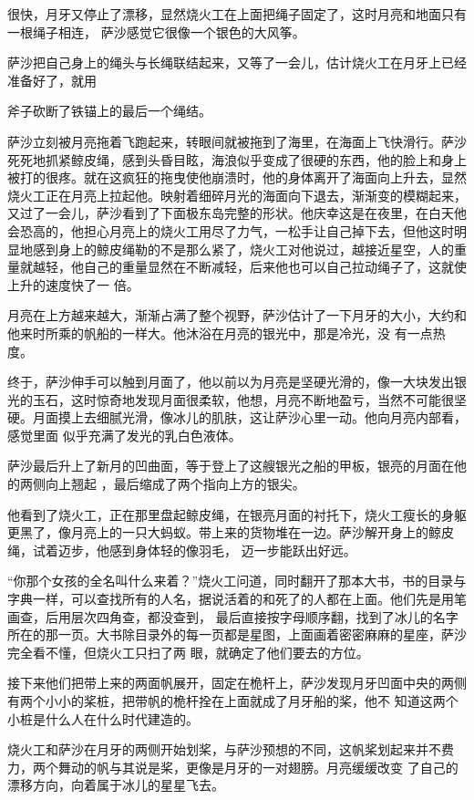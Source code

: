 \documentclass{article}
\begin{document}
很快，月牙又停止了漂移，显然烧火工在上面把绳子固定了，这时月亮和地面只有一根绳子相连，
萨沙感觉它很像一个银色的大风筝。 

萨沙把自己身上的绳头与长绳联结起来，又等了一会儿，估计烧火工在月牙上已经准备好了，就用

\newpage
斧子砍断了铁锚上的最后一个绳结。 

萨沙立刻被月亮拖着飞跑起来，转眼间就被拖到了海里，在海面上飞快滑行。萨沙死死地抓紧鲸皮绳，感到头昏目眩，海浪似乎变成了很硬的东西，他的脸上和身上被打的很疼。就在这疯狂的拖曳使他崩溃时，他的身体离开了海面向上升去，显然烧火工正在月亮上拉起他。映射着细碎月光的海面向下退去，渐渐变的模糊起来，又过了一会儿，萨沙看到了下面极东岛完整的形状。他庆幸这是在夜里，在白天他会恐高的，他担心月亮上的烧火工用尽了力气，一松手让自己掉下去，但他这时明显地感到身上的鲸皮绳勒的不是那么紧了，烧火工对他说过，越接近星空，人的重量就越轻，他自己的重量显然在不断减轻，后来他也可以自己拉动绳子了，这就使上升的速度快了一
倍。 

月亮在上方越来越大，渐渐占满了整个视野，萨沙估计了一下月牙的大小，大约和他来时所乘的帆船的一样大。他沐浴在月亮的银光中，那是冷光，没
有一点热度。 

\newpage

终于，萨沙伸手可以触到月面了，他以前以为月亮是坚硬光滑的，像一大块发出银光的玉石，这时惊奇地发现月面很柔软，他想，月亮不断地盈亏，当然不可能很坚硬。月面摸上去细腻光滑，像冰儿的肌肤，这让萨沙心里一动。他向月亮内部看，感觉里面
似乎充满了发光的乳白色液体。 

萨沙最后升上了新月的凹曲面，等于登上了这艘银光之船的甲板，银亮的月面在他的两侧向上翘起
，最后缩成了两个指向上方的银尖。 

他看到了烧火工，正在那里盘起鲸皮绳，在银亮月面的衬托下，烧火工瘦长的身躯更黑了，像月亮上的一只大蚂蚁。带上来的货物堆在一边。萨沙解开身上的鲸皮绳，试着迈步，他感到身体轻的像羽毛，
迈一步能跃出好远。 

“你那个女孩的全名叫什么来着？”烧火工问道，同时翻开了那本大书，书的目录与字典一样，可以查找所有的人名，据说活着的和死了的人都在上面。他们先是用笔画查，后用层次四角查，都没查到，
\newpage
最后直接按字母顺序翻，找到了冰儿的名字所在的那一页。大书除目录外的每一页都是星图，上面画着密密麻麻的星座，萨沙完全看不懂，但烧火工只扫了两
眼，就确定了他们要去的方位。 

接下来他们把带上来的两面帆展开，固定在桅杆上，萨沙发现月牙凹面中央的两侧有两个小小的桨桩，把带帆的桅杆拴在上面就成了月牙船的桨，他不
知道这两个小桩是什么人在什么时代建造的。 

烧火工和萨沙在月牙的两侧开始划桨，与萨沙预想的不同，这帆桨划起来并不费力，两个舞动的帆与其说是桨，更像是月牙的一对翅膀。月亮缓缓改变
了自己的漂移方向，向着属于冰儿的星星飞去。 
\end{document}

